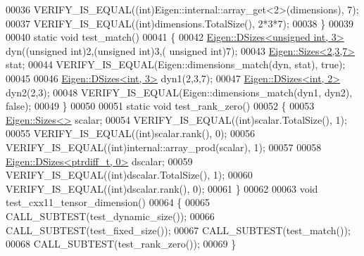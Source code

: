 \begin{DoxyCode}
00036   VERIFY\_IS\_EQUAL((\textcolor{keywordtype}{int})Eigen::internal::array\_get<2>(dimensions), 7);
00037   VERIFY\_IS\_EQUAL((\textcolor{keywordtype}{int})dimensions.TotalSize(), 2*3*7);
00038 \}
00039 
00040 \textcolor{keyword}{static} \textcolor{keywordtype}{void} test\_match()
00041 \{
00042   \hyperlink{struct_eigen_1_1_d_sizes}{Eigen::DSizes<unsigned int, 3>} dyn((\textcolor{keywordtype}{unsigned} \textcolor{keywordtype}{int})2,(\textcolor{keywordtype}{unsigned} \textcolor{keywordtype}{int})3,(\textcolor{keywordtype}{
      unsigned} \textcolor{keywordtype}{int})7);
00043   \hyperlink{struct_eigen_1_1_sizes}{Eigen::Sizes<2,3,7>} stat;
00044   VERIFY\_IS\_EQUAL(Eigen::dimensions\_match(dyn, stat), \textcolor{keyword}{true});
00045 
00046   \hyperlink{struct_eigen_1_1_d_sizes}{Eigen::DSizes<int, 3>} dyn1(2,3,7);
00047   \hyperlink{struct_eigen_1_1_d_sizes}{Eigen::DSizes<int, 2>} dyn2(2,3);
00048   VERIFY\_IS\_EQUAL(Eigen::dimensions\_match(dyn1, dyn2), \textcolor{keyword}{false});
00049 \}
00050 
00051 \textcolor{keyword}{static} \textcolor{keywordtype}{void} test\_rank\_zero()
00052 \{
00053   \hyperlink{struct_eigen_1_1_sizes}{Eigen::Sizes<>} scalar;
00054   VERIFY\_IS\_EQUAL((\textcolor{keywordtype}{int})scalar.TotalSize(), 1);
00055   VERIFY\_IS\_EQUAL((\textcolor{keywordtype}{int})scalar.rank(), 0);
00056   VERIFY\_IS\_EQUAL((\textcolor{keywordtype}{int})internal::array\_prod(scalar), 1);
00057 
00058   \hyperlink{struct_eigen_1_1_d_sizes}{Eigen::DSizes<ptrdiff\_t, 0>} dscalar;
00059   VERIFY\_IS\_EQUAL((\textcolor{keywordtype}{int})dscalar.TotalSize(), 1);
00060   VERIFY\_IS\_EQUAL((\textcolor{keywordtype}{int})dscalar.rank(), 0);
00061 \}
00062 
00063 \textcolor{keywordtype}{void} test\_cxx11\_tensor\_dimension()
00064 \{
00065   CALL\_SUBTEST(test\_dynamic\_size());
00066   CALL\_SUBTEST(test\_fixed\_size());
00067   CALL\_SUBTEST(test\_match());
00068   CALL\_SUBTEST(test\_rank\_zero());
00069 \}
\end{DoxyCode}
